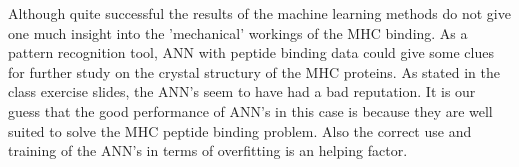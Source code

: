 Although quite successful the results of the machine learning methods do not give one much insight into the 'mechanical' workings of the MHC binding.
As a pattern recognition tool, ANN with peptide binding data could give some clues for further study on the crystal structury of the MHC proteins.
As stated in the class exercise slides, the ANN's seem to have had a bad reputation. 
It is our guess that the good performance of ANN's in this case is because they are well suited to solve the MHC peptide binding problem. 
Also the correct use and training of the ANN's in terms of overfitting is an helping factor.
